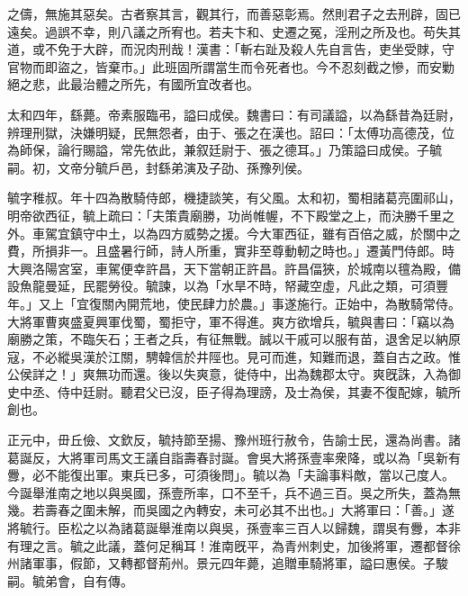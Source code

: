 \begin{pinyinscope}
之儔，無施其惡矣。古者察其言，觀其行，而善惡彰焉。然則君子之去刑辟，固已遠矣。過誤不幸，則八議之所宥也。若夫卞和、史遷之冤，淫刑之所及也。苟失其道，或不免于大辟，而況肉刑哉！漢書：「斬右趾及殺人先自言告，吏坐受賕，守官物而即盜之，皆棄巿。」此班固所謂當生而令死者也。今不忍刻截之慘，而安勦絕之悲，此最治體之所先，有國所宜改者也。

太和四年，繇薨。帝素服臨弔，謚曰成侯。魏書曰：有司議謚，以為繇昔為廷尉，辨理刑獄，決嫌明疑，民無怨者，由于、張之在漢也。詔曰：「太傅功高德茂，位為師保，論行賜謚，常先依此，兼叙廷尉于、張之德耳。」乃策謚曰成侯。子毓嗣。初，文帝分毓戶邑，封繇弟演及子劭、孫豫列侯。

毓字稚叔。年十四為散騎侍郎，機捷談笑，有父風。太和初，蜀相諸葛亮圍祁山，明帝欲西征，毓上疏曰：「夫策貴廟勝，功尚帷幄，不下殿堂之上，而決勝千里之外。車駕宜鎮守中土，以為四方威勢之援。今大軍西征，雖有百倍之威，於關中之費，所損非一。且盛暑行師，詩人所重，實非至尊動軔之時也。」遷黃門侍郎。時大興洛陽宮室，車駕便幸許昌，天下當朝正許昌。許昌偪狹，於城南以氊為殿，備設魚龍曼延，民罷勞役。毓諫，以為「水旱不時，帑藏空虛，凡此之類，可須豐年。」又上「宜復關內開荒地，使民肆力於農。」事遂施行。正始中，為散騎常侍。大將軍曹爽盛夏興軍伐蜀，蜀拒守，軍不得進。爽方欲增兵，毓與書曰：「竊以為廟勝之策，不臨矢石；王者之兵，有征無戰。誠以干戚可以服有苗，退舍足以納原寇，不必縱吳漢於江關，騁韓信於井陘也。見可而進，知難而退，蓋自古之政。惟公侯詳之！」爽無功而還。後以失爽意，徙侍中，出為魏郡太守。爽旣誅，入為御史中丞、侍中廷尉。聽君父已沒，臣子得為理謗，及士為侯，其妻不復配嫁，毓所創也。

正元中，毌丘儉、文欽反，毓持節至揚、豫州班行赦令，告諭士民，還為尚書。諸葛誕反，大將軍司馬文王議自詣壽春討誕。會吳大將孫壹率衆降，或以為「吳新有釁，必不能復出軍。東兵已多，可須後問」。毓以為「夫論事料敵，當以己度人。今誕舉淮南之地以與吳國，孫壹所率，口不至千，兵不過三百。吳之所失，蓋為無幾。若壽春之圍未解，而吳國之內轉安，未可必其不出也。」大將軍曰：「善。」遂將毓行。臣松之以為諸葛誕舉淮南以與吳，孫壹率三百人以歸魏，謂吳有釁，本非有理之言。毓之此議，蓋何足稱耳！淮南旣平，為青州刺史，加後將軍，遷都督徐州諸軍事，假節，又轉都督荊州。景元四年薨，追贈車騎將軍，謚曰惠侯。子駿嗣。毓弟會，自有傳。


\end{pinyinscope}